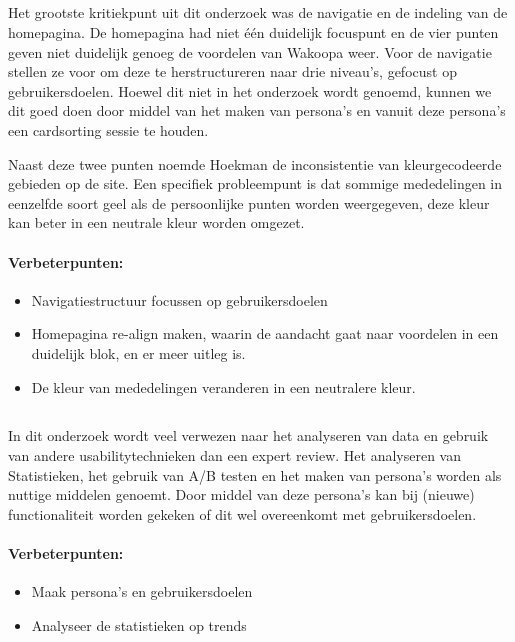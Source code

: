 \documentclass[a4paper, 10pt, pdftex]{report}
\begin{document}
    \subsection{\cite{Hoekman2008}}
    Het grootste kritiekpunt uit dit onderzoek was de navigatie en de indeling van de homepagina. De homepagina had niet \'e\'en duidelijk focuspunt en de vier punten geven niet duidelijk genoeg de voordelen van Wakoopa weer. Voor de navigatie stellen ze voor om deze te herstructureren naar drie niveau's, gefocust op gebruikersdoelen. Hoewel dit niet in het onderzoek wordt genoemd, kunnen we dit goed doen door middel van het maken van persona's en vanuit deze persona's een cardsorting sessie te houden.

    Naast deze twee punten noemde Hoekman de inconsistentie van kleurgecodeerde gebieden op de site. Een specifiek probleempunt is dat sommige mededelingen in eenzelfde soort geel als de persoonlijke punten worden weergegeven, deze kleur kan beter in een neutrale kleur worden omgezet.

    \paragraph{\textbf{Verbeterpunten:}}
      \begin{itemize}
        \item Navigatiestructuur focussen op gebruikersdoelen
        \item Homepagina re-align maken, waarin de aandacht gaat naar voordelen in een duidelijk blok, en er meer uitleg is.
        \item De kleur van mededelingen veranderen in een neutralere kleur.
      \end{itemize}

    \subsection{\cite{Timmerman2008}}
    In dit onderzoek wordt veel verwezen naar het analyseren van data en gebruik van andere usabilitytechnieken dan een expert review. Het analyseren van Statistieken, het gebruik van A/B testen en het maken van persona's worden als nuttige middelen genoemt. Door middel van deze persona's kan bij (nieuwe) functionaliteit worden gekeken of dit wel overeenkomt met gebruikersdoelen.

    \paragraph{\textbf{Verbeterpunten:}}
      \begin{itemize}
        \item Maak persona's en gebruikersdoelen
        \item Analyseer de statistieken op trends
      \end{itemize}
\end{document}
